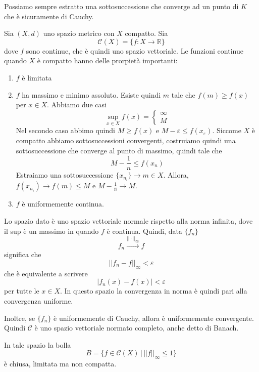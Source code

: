 \documentclass[a4paper]{article}
\begin{document}

Possiamo sempre estratto una sottosuccessione che converge ad un punto di \(K\)
che è sicuramente di Cauchy.

Sia \((X, d)\) uno spazio metrico con \(X\) compatto.
Sia
\[
    \mathcal{C}(X) = \{f\colon X \to \mathbb{R}\}
\]
dove \(f\) sono continue, che è quindi uno spazio vettoriale.
Le funzioni continue quando \(X\) è compatto hanno delle prorpietà importanti:
\begin{enumerate}
    \item \(f\) è limitata
    \item \(f\) ha massimo e minimo assoluto.
    Esiste quindi \(m\) tale che \(f(m) \geq f(x)\) per \(x\in X\).
    Abbiamo due casi
    \[
        \sup_{x\in X} f(x) = \begin{cases}
            \infty \\
            M
        \end{cases}
    \]
    Nel secondo caso abbimo quindi \(M \geq f(x)\) e \(M - \varepsilon \leq f(x_{\varepsilon})\).
    Siccome \(X\) è compatto abbiamo sottosuccessioni convergenti, costruiamo quindi
    una sottosuccessione che converge al punto di massimo, quindi tale che
    \[
        M - \frac{1}{n} \leq f(x_n)
    \]
    Estraiamo una sottosuccessione \(\{x_{n_i}\} \to m \in X\).
    Allora, \(f(x_{n_i}) \to f(m) \leq M\) e \(M - \frac{1}{n} \to M\).

    \item \(f\) è uniformemente continua.
\end{enumerate}
Lo spazio dato è uno spazio vettoriale normale rispetto alla norma infinita,
dove il sup è un massimo in quando \(f\) è continua.
Quindi, data \(\{f_n\}\)
\[
    f_n \overset{||\cdot||_\infty}{\longrightarrow} f
\]
significa che
\[
    ||f_n - f||_\infty < \varepsilon
\]
che è equivalente a scrivere
\[
    |f_n(x) - f(x)| < \varepsilon
\]
per tutte le \(x\in X\).
In questo spazio la convergenza in norma è quindi pari alla convergenza uniforme.

Inoltre, se \(\{f_n\}\) è uniformemente di Cauchy,
allora è uniformemente convergente.
Quindi \(\mathcal{C}\) è uno spazio vettoriale normato completo, anche detto di Banach.


In tale spazio la bolla
\[
    B = \{f \in \mathcal{C}(X) \,|\, ||f||_\infty \leq 1\}
\]
è chiusa, limitata ma non compatta.
\end{document}
